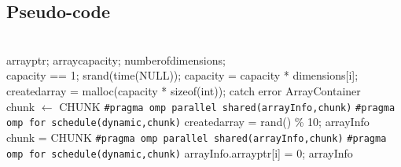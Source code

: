 \documentclass[10pt,twocolumn]{witseiepaper}
\begin{document}
\begin{appendix}
	
\section{Pseudo-code}

	\begin{algorithm}[htbp]
		\begin{algorithmic}
			\\
			\State array\textunderscore ptr;
			\State array\textunderscore capacity;
			\State number\textunderscore of\textunderscore dimensions;
			\\
			
			
			\State capacity == 1;
			\State srand(time(NULL));
			\State capacity = capacity * dimensions[i];
			\EndFor
			\State created\textunderscore array = malloc(capacity * sizeof(int));
			\State catch error
			\EndIf
			\EndFunction
			\State \Return ArrayContainer \\
			
			\State chunk $\leftarrow$ CHUNK
			\State \verb|#pragma omp parallel shared(arrayInfo,chunk)|
			\State \verb|#pragma omp for schedule(dynamic,chunk)|
			\State created\textunderscore array = rand() \% 10;
			\EndFor
			\State \Return arrayInfo \\
			
			\State chunk = CHUNK
			\State \verb|#pragma omp parallel shared(arrayInfo,chunk)|
			\State \verb|#pragma omp for schedule(dynamic,chunk)|
			\State  arrayInfo.\textunderscore array\textunderscore ptr[i] = 0;
			\EndFor
			\EndFunction
			\State \Return arrayInfo \\
			

\end{algorithmic}
\end{algorithm}
\end{appendix}
\end{document}

